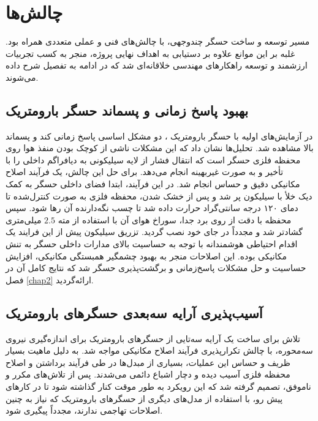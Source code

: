 \section{چالش‌ها}

مسیر توسعه و ساخت حسگر چندوجهی، با چالش‌های فنی و عملی متعددی همراه بود. غلبه بر این موانع علاوه بر دستیابی به اهداف نهایی پروژه، منجر به کسب تجربیات ارزشمند و توسعه راهکارهای مهندسی خلاقانه‌ای شد که در ادامه به تفصیل شرح داده می‌شوند.

\subsection{بهبود پاسخ زمانی و پسماند حسگر بارومتریک}
در آزمایش‌های اولیه با حسگر بارومتریک ، دو مشکل اساسی پاسخ زمانی کند و پسماند بالا مشاهده شد. تحلیل‌ها نشان داد که این مشکلات ناشی از کوچک بودن منفذ هوا روی محفظه فلزی حسگر است که انتقال فشار از لایه سیلیکونی به دیافراگم داخلی را با تأخیر و به صورت غیربهینه انجام می‌دهد. برای حل این چالش، یک فرآیند اصلاح مکانیکی دقیق و حساس انجام شد. در این فرآیند، ابتدا فضای داخلی حسگر به کمک دیک خلأ با سیلیکون پر شد و پس از خشک شدن، محفظه فلزی به صورت کنترل‌شده تا دمای ۱۲۰ درجه سانتی‌گراد حرارت داده شد تا چسب نگه‌دارنده آن رها شود. سپس محفظه با دقت از روی برد جدا، سوراخ هوای آن با استفاده از مته $2.5$ میلی‌متری گشادتر شد و مجدداً در جای خود نصب گردید. تزریق سیلیکون پیش از این فرایند یک اقدام احتیاطی هوشمندانه با توجه به حساسیت بالای مدارات داخلی حسگر به تنش مکانیکی بوده. این اصلاحات منجر به بهبود چشمگیر همبستگی مکانیکی، افزایش حساسیت و حل مشکلات پاسخ‌زمانی و برگشت‌پذیری حسگر شد که نتایج کامل آن در فصل \ref{chap2} ارائه‌گردید. 

\subsection{آسیب‌پذیری آرایه سه‌بعدی حسگرهای بارومتریک} 
تلاش برای ساخت یک آرایه سه‌تایی از حسگرهای بارومتریک برای اندازه‌گیری نیروی سه‌محوره، با چالش تکرارپذیری فرآیند اصلاح مکانیکی مواجه شد. به دلیل ماهیت بسیار ظریف و حساس این عملیات، بسیاری از مبدل‌ها در طی فرآیند برداشتن و اصلاح محفظه فلزی آسیب دیده و دچار اشباع دائمی می‌شدند. پس از تلاش‌های مکرر و ناموفق، تصمیم گرفته شد که این رویکرد به طور موقت کنار گذاشته شود تا در کارهای پیش رو، با استفاده از مدل‌های دیگری از حسگرهای بارومتریک که نیاز به چنین اصلاحات تهاجمی ندارند، مجدداً پیگیری شود.

